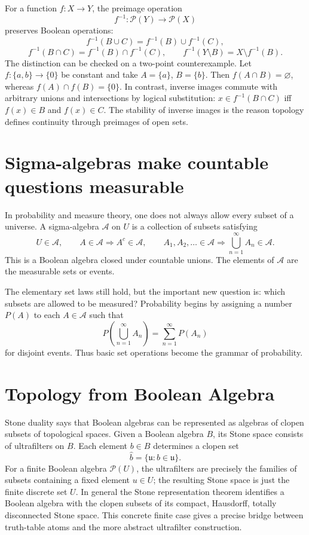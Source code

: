For a function \(f:X\to Y\), the preimage operation
\[
  f^{-1}:\mathcal P(Y)\to\mathcal P(X)
\]
preserves Boolean operations:
\[
  f^{-1}(B\cup C)=f^{-1}(B)\cup f^{-1}(C),
\]
\[
  f^{-1}(B\cap C)=f^{-1}(B)\cap f^{-1}(C),\qquad
  f^{-1}(Y\setminus B)=X\setminus f^{-1}(B).
\]
The distinction can be checked on a two-point counterexample. Let \(f:\{a,b\}\to\{0\}\) be constant and take \(A=\{a\}\), \(B=\{b\}\). Then \(f(A\cap B)=\varnothing\), whereas \(f(A)\cap f(B)=\{0\}\). In contrast, inverse images commute with arbitrary unions and intersections by logical substitution: \(x\in f^{-1}(B\cap C)\) iff \(f(x)\in B\) and \(f(x)\in C\). The stability of inverse images is the reason topology defines continuity through preimages of open sets.

\section{Sigma-algebras make countable questions measurable}

In probability and measure theory, one does not always allow every subset of a universe.  A sigma-algebra $\mathcal A$ on $U$ is a collection of subsets satisfying
\[
  U\in\mathcal A,\qquad A\in\mathcal A\Rightarrow A^c\in\mathcal A,\qquad
  A_1,A_2,\ldots\in\mathcal A\Rightarrow \bigcup_{n=1}^{\infty}A_n\in\mathcal A.
\]
This is a Boolean algebra closed under countable unions.  The elements of $\mathcal A$ are the measurable sets or events.

The elementary set laws still hold, but the important new question is: which subsets are allowed to be measured?  Probability begins by assigning a number $P(A)$ to each $A\in\mathcal A$ such that
\[
  P\left(\bigcup_{n=1}^{\infty}A_n\right)=\sum_{n=1}^{\infty}P(A_n)
\]
for disjoint events.  Thus basic set operations become the grammar of probability.

\section{Topology from Boolean Algebra}

Stone duality says that Boolean algebras can be represented as algebras of clopen subsets of topological spaces.  Given a Boolean algebra \(B\), its Stone space consists of ultrafilters on \(B\).  Each element \(b\in B\) determines a clopen set
\[
  \widehat b=\{\mathfrak u: b\in\mathfrak u\}.
\]
For a finite Boolean algebra \(\mathcal P(U)\), the ultrafilters are precisely the families of subsets containing a fixed element \(u\in U\); the resulting Stone space is just the finite discrete set \(U\). In general the Stone representation theorem identifies a Boolean algebra with the clopen subsets of its compact, Hausdorff, totally disconnected Stone space. This concrete finite case gives a precise bridge between truth-table atoms and the more abstract ultrafilter construction.
